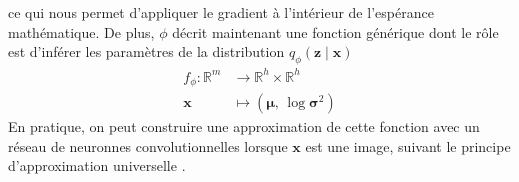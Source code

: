 ce qui nous permet d'appliquer le gradient à l'intérieur de l'espérance mathématique.
De plus, $\phi$ décrit maintenant une fonction générique dont le rôle est d'inférer les 
paramètres de la distribution $q_\phi(\mathbf{z} \mid \mathbf{x})$
\begin{equation}
        \begin{aligned}
                f_\phi: \mathbb{R}^{m} &\rightarrow \mathbb{R}^{h} \times \mathbb{R}^{h}\\ \mathbf{x} &\mapsto (\boldsymbol{\mu},\, \log \boldsymbol{\sigma}^{2})
        \end{aligned}
\end{equation} 
En pratique, on peut construire une approximation de 
cette fonction avec un réseau de neuronnes convolutionnelles lorsque $\mathbf{x}$ est une image, 
suivant le principe d'approximation universelle \citep{Cybenko1989,Hornik1991}. 

